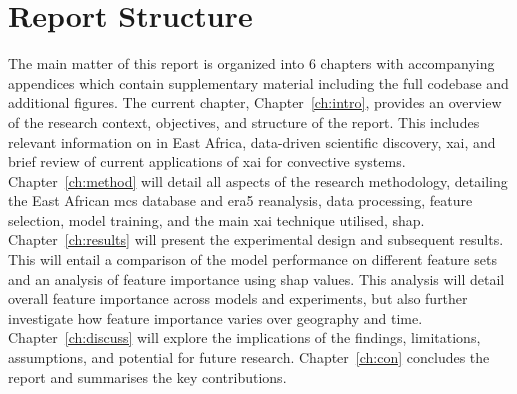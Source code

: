 \section{Report Structure}

The main matter of this report is organized into 6 chapters with accompanying appendices which contain supplementary material including the full codebase and additional figures. The current chapter, Chapter~\ref{ch:intro}, provides an overview of the research context, objectives, and structure of the report. This includes relevant information on  in East Africa, data-driven scientific discovery, \acrfull{xai}, and brief review of current applications of \acrshort{xai} for convective systems. Chapter~\ref{ch:method} will detail all aspects of the research methodology, detailing the East African \acrshort{mcs} database and \acrshort{era5} reanalysis, data processing, feature selection, model training, and the main \acrshort{xai} technique utilised, \acrshort{shap}. Chapter~\ref{ch:results} will present the experimental design and subsequent results. This will entail a comparison of the model performance on different feature sets and an analysis of feature importance using \acrshort{shap} values. This analysis will detail overall feature importance across models and experiments, but also further investigate how feature importance varies over geography and time. Chapter~\ref{ch:discuss} will explore the implications of the findings, limitations, assumptions, and potential for future research. Chapter~\ref{ch:con} concludes the report and summarises the key contributions.